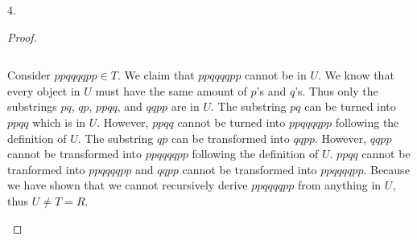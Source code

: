 \documentclass[11pt]{article}
\newenvironment{myproof}
{\begin{proof} \begin{adjustwidth}{3em}{0pt}$ $\par\nobreak\ignorespaces}
{\end{adjustwidth} \end{proof}}
\begin{document}
\begin{flushleft}
4.

\begin{myproof}
Consider $ppqqqqpp \in T$. We claim that $ppqqqqpp$ cannot be in $U$. We know that every object in $U$ must have the same amount of $p$'s and $q$'s. Thus only the substrings $pq$, $qp$, $ppqq$, and $qqpp$ are in $U$. The substring $pq$ can be turned into $ppqq$ which is in $U$. However, $ppqq$ cannot be turned into $ppqqqqpp$ following the definition of $U$. The substring $qp$ can be transformed into $qqpp$. However, $qqpp$ cannot be transformed into $ppqqqqpp$  following the definition of $U$. $ppqq$ cannot be tranformed into $ppqqqqpp$ and $qqpp$ cannot be transformed into $ppqqqqpp$. Because we have shown that we cannot recursively derive $ppqqqqpp$ from anything in $U$, thus $U \neq T = R$.
\end{myproof}


\end{flushleft}
\end{document}
